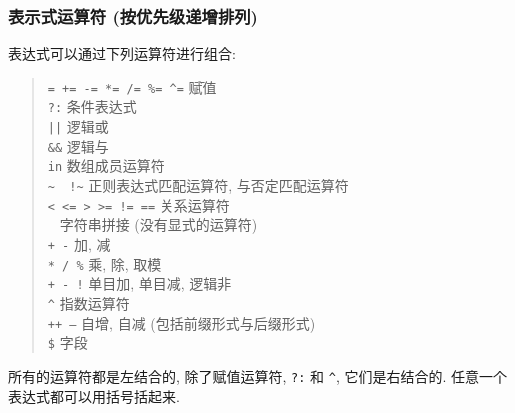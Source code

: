 \subsubsection{表示式运算符 (按优先级递增排列)}
表达式可以通过下列运算符进行组合:
\begin{quote}
    \begin{tabbing}
        \verb'= += -= *= /= %= ^=' \hspace{2em} \= 赋值 \\

        \texttt{?:} \> 条件表达式 \\

        \texttt{||} \> 逻辑或 \\

        \verb'&&' \> 逻辑与 \\

        \texttt{in} \> 数组成员运算符 \\

        \verb'~  !~' \> 正则表达式匹配运算符, 与否定匹配运算符 \\

        \texttt{< <= > >= != ==} \> 关系运算符 \\

        \texttt{ }      \> 字符串拼接 (没有显式的运算符) \\

        \texttt{+ -}    \> 加, 减 \\

        \verb'* / %'  \> 乘, 除, 取模 \\

        \texttt{+ - !}  \> 单目加, 单目减, 逻辑非 \\

        \texttt{\^}      \> 指数运算符 \\

        \texttt{++ --}  \> 自增, 自减 (包括前缀形式与后缀形式) \\

        \texttt{\$}     \> 字段 \\
    \end{tabbing}
\end{quote}
所有的运算符都是左结合的, 除了赋值运算符, \texttt{?:} 和 \texttt{\^},
它们是右结合的. 任意一个表达式都可以用括号括起来.
